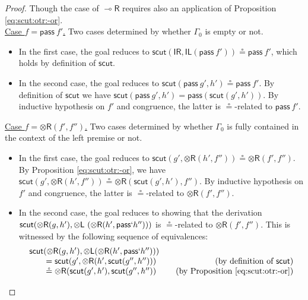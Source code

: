\documentclass[sn-mathphys-num]{sn-jnl}%
\newcommand{\GG}{\Gamma}
\newcommand{\vd}{\vdash}
\newcommand{\tl}{\otimes \mathsf{L}}
\newcommand{\tr}{\otimes\mathsf{R}}
\newcommand{\pass}{\mathsf{pass}}
\newcommand{\unitl}{\mathsf{IL}}
\newcommand{\unitr}{\mathsf{IR}}
\newcommand{\lolli}{\multimap}
\newcommand{\lright}{{\lolli}\mathsf{R}}
\newcommand{\mf}[1]{\mathsf{#1}}
\newcommand{\scut}[2]{\mf{scut} (#1 , #2)}
\theoremstyle{thmstyleone}%
\theoremstyle{thmstyletwo}%
\theoremstyle{thmstylethree}%
\begin{document}
\begin{proof}
  Though the case of $\lright$ requires also an application of Proposition \ref{eq:scut:otr:-or}.
  \\
  \underline{Case $f = \pass \ f'$.} Two cases determined by whether $\GG_0$ is empty or not.
  \begin{itemize}
    \item In the first case, the goal reduces to $\scut{\unitr}{\unitl (\pass \ f')} \circeq \pass \ f'$, which holds by definition of $\mf{scut}$.
    \item In the second case, the goal reduces to $\scut{\pass \ g'}{h'} \circeq \pass\ f'$. By definition of $\mf{scut}$ we have
$\scut{\pass \ g'}{h'} = \pass (\scut{g'}{h'})$. By inductive hypothesis on $f'$ and congruence, the latter is $\circeq$-related to $\pass\ f'$.
  \end{itemize} 
  \underline{Case $f = \tr (f',f'')$.} Two cases determined by whether $\GG_0$ is fully contained in the context of the left premise or not.
  \begin{itemize}
    \item In the first case, the goal reduces to $\scut{g'}{\tr (h', f'')} \circeq \tr (f' , f'')$. By Proposition \ref{eq:scut:otr:-or}, we have $\scut{g'}{\tr (h', f'')} \circeq \tr (\scut{g'}{h'} , f'')$. By inductive hypothesis on $f'$ and congruence, the latter is $\circeq$-related to $\tr (f' , f'')$.
    \item In the second case, the goal reduces to showing that the derivation $\mf{scut}(\tr (g,h'),\tl\ (\tr (h',\pass` h'')))$ is $\circeq$-related to $\tr (f',f'')$.
      This is witnessed by the following sequence of equivalences:
  \[\arraycolsep=10pt    
      \begin{array}{lr}
        \mf{scut}(\tr (g,h'),\tl (\tr (h',\pass` h''))) \\
        \qquad = \mf{scut}(g',\tr (h',\mf{scut}(g'',h'')))
        & \text{(by definition of $\mf{scut}$)} \\
        \qquad \circeq \tr (\mf{scut}(g',h'),\mf{scut}(g'',h''))
        & \text{(by Proposition \ref{eq:scut:otr:-or})} \\

\end{array}\]
\end{itemize}
\end{proof}
\end{document}

